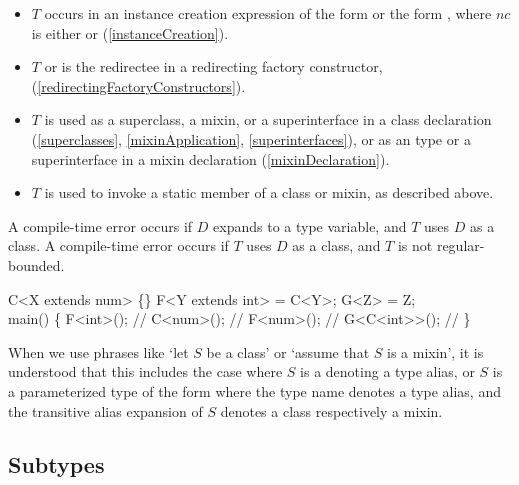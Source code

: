 \documentclass[makeidx]{article}
\begin{document}
{\begin{itemize}
\item
  $T$ occurs in an instance creation expression of the form
   or the form ,
  where $nc$ is either \NEW{} or \CONST{}
  (\ref{instanceCreation}).
\item
  $T$ or  is the redirectee in a redirecting factory constructor,
  (\ref{redirectingFactoryConstructors}).
\item
  $T$ is used as a superclass, a mixin, or a superinterface
  in a class declaration
  (\ref{superclasses}, \ref{mixinApplication}, \ref{superinterfaces}),
  or as an \ON{} type or a superinterface in a mixin declaration
  (\ref{mixinDeclaration}).
\item
  $T$ is used to invoke a static member of a class or mixin,
  as described above.
\end{itemize}

\LMHash{}%
A compile-time error occurs if $D$ expands to a type variable,
and $T$ uses $D$ as a class.
A compile-time error occurs if $T$ uses $D$ as a class,
and $T$ is not regular-bounded.

\begin{dartCode}
\CLASS{} C<X extends num> \{\}
\TYPEDEF{} F<Y extends int> = C<Y>;
\TYPEDEF{} G<Z> = Z;
\\
\VOID{} main() \{
  F<int>(); // 
  C<num>(); // 
  F<num>(); // 
  G<C<int>{}>(); // 
\}
\end{dartCode}

\LMHash{}%
When we use phrases like `let $S$ be a class' or `assume that $S$ is a mixin',
it is understood that this includes the case where
$S$ is a  denoting a type alias, or
$S$ is a parameterized type of the form
where the type name denotes a type alias,
and the transitive alias expansion of $S$ denotes a class respectively a mixin.


\subsection{Subtypes}

}
\end{document}
